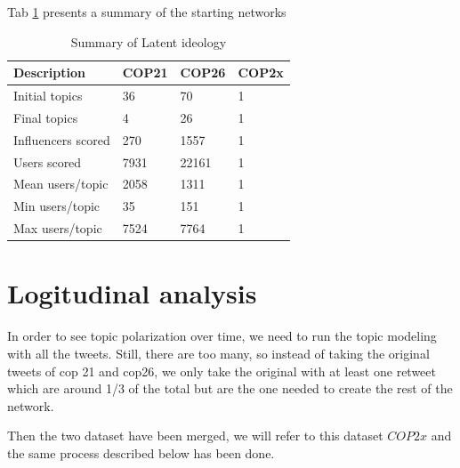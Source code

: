 Tab     \ref{tab:recap_ideology} presents a summary of the starting networks 


\begin{table}[h]
    \centering
    \begin{tabular}{|l|l|l|l|}
        \hline
        \textbf{Description} & \textbf{COP21} & \textbf{COP26} & \textbf{COP2x}\\ \hline
        Initial topics & 36 & 70 & 1 \\ \hline
        Final topics & 4 & 26 & 1\\ \hline
        Influencers scored & 270 & 1557 & 1\\ \hline
        Users scored & 7931 & 22161& 1 \\ \hline
        Mean users/topic &  2058 & 1311 & 1\\ \hline
        Min users/topic & 35 & 151 & 1\\ \hline
        Max users/topic & 7524 & 7764 & 1\\ \hline
        \end{tabular}
        \caption{Summary of Latent ideology}
    \label{tab:recap_ideology}
\end{table}


\section{Logitudinal analysis}
In order to see topic polarization over time, we need to run the topic modeling with all the tweets. Still, there are too many, so instead of taking the original tweets of cop 21 and cop26, we only take the original with at least one retweet which are around 1/3 of the total but are the one needed to create  the rest of the network.

Then the two dataset have been merged, we will refer to this dataset $COP2x$ and the same process described below has been done.




 
